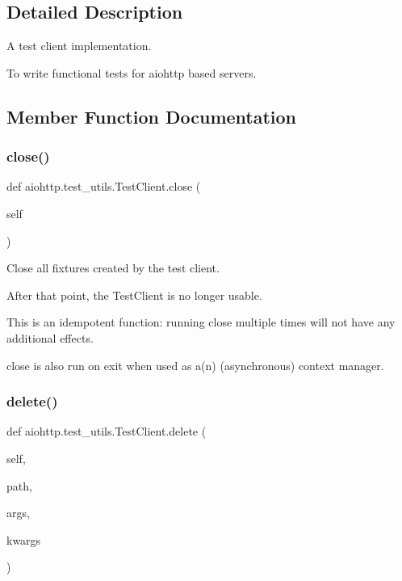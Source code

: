 \subsection{Detailed Description}
\begin{DoxyVerb}A test client implementation.

To write functional tests for aiohttp based servers.\end{DoxyVerb}
 

\subsection{Member Function Documentation}
\mbox{\label{classaiohttp_1_1test__utils_1_1_test_client_a9c48b2869ddd4bf8d27aa268edcaa4e8}} 
\subsubsection{\texorpdfstring{close()}{close()}}
{\footnotesize\ttfamily def aiohttp.\+test\+\_\+utils.\+Test\+Client.\+close (\begin{DoxyParamCaption}\item[{}]{self }\end{DoxyParamCaption})}

\begin{DoxyVerb}Close all fixtures created by the test client.

After that point, the TestClient is no longer usable.

This is an idempotent function: running close multiple times
will not have any additional effects.

close is also run on exit when used as a(n) (asynchronous)
context manager.\end{DoxyVerb}
 \mbox{\label{classaiohttp_1_1test__utils_1_1_test_client_a5253f095ff3f9c3c27a92c3f1ae153c8}} 
\subsubsection{\texorpdfstring{delete()}{delete()}}
{\footnotesize\ttfamily def aiohttp.\+test\+\_\+utils.\+Test\+Client.\+delete (\begin{DoxyParamCaption}\item[{}]{self,  }\item[{}]{path,  }\item[{}]{args,  }\item[{}]{kwargs }\end{DoxyParamCaption})}

